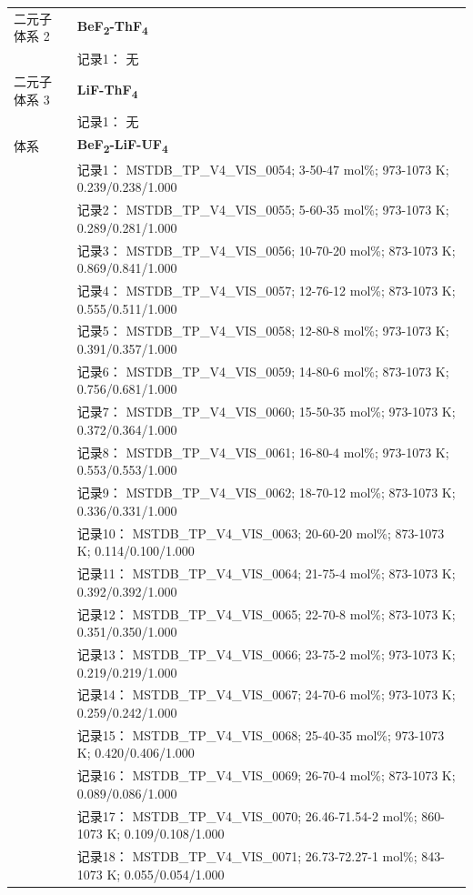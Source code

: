 \documentclass[12pt]{article}
\begin{document}
{\begin{longtable}[]{@{}
  >{\raggedright\arraybackslash}p{}
  >{\raggedright\arraybackslash}p{}@{}}
二元子体系 2 & \textbf{BeF\textsubscript{2}-ThF\textsubscript{4}} \\
 & 记录1： 无 \\
二元子体系 3 & \textbf{LiF-ThF\textsubscript{4}} \\
 & 记录1： 无 \\
\midrule
体系 & \textbf{BeF\textsubscript{2}-LiF-UF\textsubscript{4}} \\
 & 记录1： MSTDB\_TP\_V4\_VIS\_0054; 3-50-47 mol\%; 973-1073 K; 0.239/0.238/1.000 \\
 & 记录2： MSTDB\_TP\_V4\_VIS\_0055; 5-60-35 mol\%; 973-1073 K; 0.289/0.281/1.000 \\
 & 记录3： MSTDB\_TP\_V4\_VIS\_0056; 10-70-20 mol\%; 873-1073 K; 0.869/0.841/1.000 \\
 & 记录4： MSTDB\_TP\_V4\_VIS\_0057; 12-76-12 mol\%; 873-1073 K; 0.555/0.511/1.000 \\
 & 记录5： MSTDB\_TP\_V4\_VIS\_0058; 12-80-8 mol\%; 973-1073 K; 0.391/0.357/1.000 \\
 & 记录6： MSTDB\_TP\_V4\_VIS\_0059; 14-80-6 mol\%; 873-1073 K; 0.756/0.681/1.000 \\
 & 记录7： MSTDB\_TP\_V4\_VIS\_0060; 15-50-35 mol\%; 973-1073 K; 0.372/0.364/1.000 \\
 & 记录8： MSTDB\_TP\_V4\_VIS\_0061; 16-80-4 mol\%; 973-1073 K; 0.553/0.553/1.000 \\
 & 记录9： MSTDB\_TP\_V4\_VIS\_0062; 18-70-12 mol\%; 873-1073 K; 0.336/0.331/1.000 \\
 & 记录10： MSTDB\_TP\_V4\_VIS\_0063; 20-60-20 mol\%; 873-1073 K; 0.114/0.100/1.000 \\
 & 记录11： MSTDB\_TP\_V4\_VIS\_0064; 21-75-4 mol\%; 873-1073 K; 0.392/0.392/1.000 \\
 & 记录12： MSTDB\_TP\_V4\_VIS\_0065; 22-70-8 mol\%; 873-1073 K; 0.351/0.350/1.000 \\
 & 记录13： MSTDB\_TP\_V4\_VIS\_0066; 23-75-2 mol\%; 973-1073 K; 0.219/0.219/1.000 \\
 & 记录14： MSTDB\_TP\_V4\_VIS\_0067; 24-70-6 mol\%; 973-1073 K; 0.259/0.242/1.000 \\
 & 记录15： MSTDB\_TP\_V4\_VIS\_0068; 25-40-35 mol\%; 973-1073 K; 0.420/0.406/1.000 \\
 & 记录16： MSTDB\_TP\_V4\_VIS\_0069; 26-70-4 mol\%; 873-1073 K; 0.089/0.086/1.000 \\
 & 记录17： MSTDB\_TP\_V4\_VIS\_0070; 26.46-71.54-2 mol\%; 860-1073 K; 0.109/0.108/1.000 \\
 & 记录18： MSTDB\_TP\_V4\_VIS\_0071; 26.73-72.27-1 mol\%; 843-1073 K; 0.055/0.054/1.000 \\

\end{longtable}}
\end{document}
